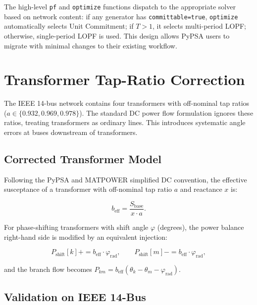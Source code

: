 The high-level \texttt{pf} and \texttt{optimize} functions dispatch to the appropriate solver based on network content: if any generator has \texttt{committable=true}, \texttt{optimize} automatically selects Unit Commitment; if $T > 1$, it selects multi-period LOPF; otherwise, single-period LOPF is used. This design allows PyPSA users to migrate with minimal changes to their existing workflow.

\section{Transformer Tap-Ratio Correction}
\label{sec:transformer}

The IEEE 14-bus network contains four transformers with off-nominal tap ratios ($a \in \{0.932, 0.969, 0.978\}$). The standard DC power flow formulation ignores these ratios, treating transformers as ordinary lines. This introduces systematic angle errors at buses downstream of transformers.

\subsection{Corrected Transformer Model}

Following the PyPSA and MATPOWER simplified DC convention, the effective susceptance of a transformer with off-nominal tap ratio $a$ and reactance $x$ is:

\begin{equation}
    b_\text{eff} = \frac{S_\text{base}}{x \cdot a}.
    \label{eq:tap_correction}
\end{equation}

For phase-shifting transformers with shift angle $\varphi$ (degrees), the power balance right-hand side is modified by an equivalent injection:

\begin{equation}
    P_\text{shift}[k] += b_\text{eff} \cdot \varphi_\text{rad}, \qquad
    P_\text{shift}[m] -= b_\text{eff} \cdot \varphi_\text{rad},
    \label{eq:phase_shift}
\end{equation}

and the branch flow becomes $P_{km} = b_\text{eff}(\theta_k - \theta_m - \varphi_\text{rad})$.

\subsection{Validation on IEEE 14-Bus}

